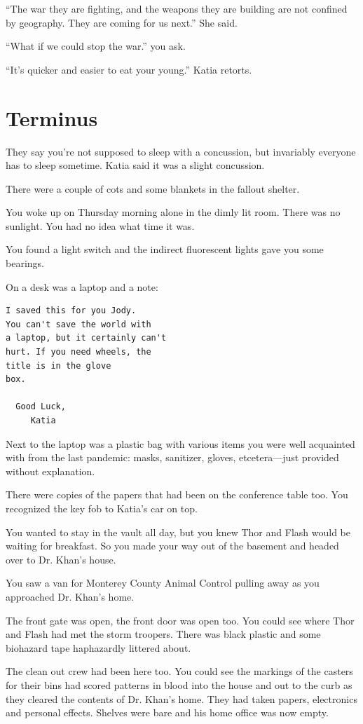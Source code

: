 \documentclass[17pt, twoside, a5paper, openright, extrafontsizes]{memoir}
\begin{document}
``The war they are fighting, and the weapons they are building are not
confined by geography. They are coming for us next.'' She said.

``What if we could stop the war.'' you ask.

``It's quicker and easier to eat your young.'' Katia retorts.


\chapter{Terminus}

They say you're not supposed to sleep with a concussion, but invariably
everyone has to sleep sometime. Katia said it was a slight concussion.

There were a couple of cots and some blankets in the fallout shelter.

You woke up on Thursday morning alone in the dimly lit room. There was
no sunlight. You had no idea what time it was.

You found a light switch and the indirect fluorescent lights gave you
some bearings.

On a desk was a laptop and a note:

\begin{verbatim}
I saved this for you Jody. 
You can't save the world with
a laptop, but it certainly can't 
hurt. If you need wheels, the 
title is in the glove
box. 

  Good Luck, 
     Katia
\end{verbatim}

Next to the laptop was a plastic bag with various items you were well
acquainted with from the last pandemic: masks, sanitizer, gloves,
etcetera---just provided without explanation.

There were copies of the papers that had been on the conference table
too. You recognized the key fob to Katia's car on top.

You wanted to stay in the vault all day, but you knew Thor and Flash
would be waiting for breakfast. So you made your way out of the basement
and headed over to Dr. Khan's house.

You saw a van for Monterey County Animal Control pulling away as you
approached Dr. Khan's home.

The front gate was open, the front door was open too. You could see
where Thor and Flash had met the storm troopers. There was black plastic
and some biohazard tape haphazardly littered about.

The clean out crew had been here too. You could see the markings of the
casters for their bins had scored patterns in blood into the house and
out to the curb as they cleared the contents of Dr. Khan's home. They
had taken papers, electronics and personal effects. Shelves were bare
and his home office was now empty.
\end{document}
